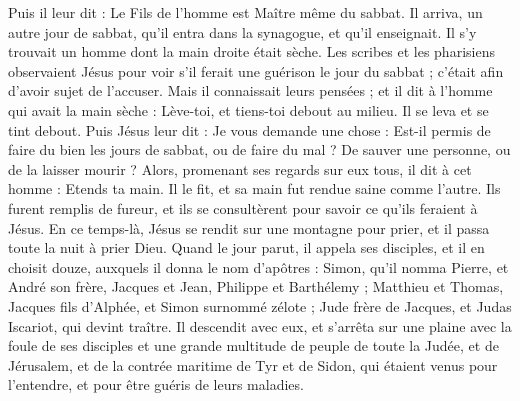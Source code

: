 \begin{multicols}{2}
Puis il leur dit : Le Fils de l'homme est Maître même du sabbat.
Il arriva, un autre jour de sabbat, qu'il entra dans la synagogue, et qu'il enseignait. Il s’y trouvait un homme dont la main droite était sèche.
Les scribes et les pharisiens observaient Jésus pour voir s’il ferait une guérison le jour du sabbat ; c’était afin d’avoir sujet de l’accuser.
Mais il connaissait leurs pensées ; et il dit à l'homme qui avait la main sèche : Lève-toi, et tiens-toi debout au milieu. Il se leva et se tint debout.
Puis Jésus leur dit : Je vous demande une chose : Est-il permis de faire du bien les jours de sabbat, ou de faire du mal ? De sauver une personne, ou de la laisser mourir ?
Alors, promenant ses regards sur eux tous, il dit à cet homme : Etends ta main. Il le fit, et sa main fut rendue saine comme l'autre.
Ils furent remplis de fureur, et ils se consultèrent pour savoir ce qu’ils feraient à Jésus.
En ce temps-là, Jésus se rendit sur une montagne pour prier, et il passa toute la nuit à prier Dieu.
Quand le jour parut, il appela ses disciples, et il en choisit douze, auxquels il donna le nom d’apôtres :
Simon, qu'il nomma Pierre, et André son frère, Jacques et Jean, Philippe et Barthélemy ;
Matthieu et Thomas, Jacques fils d'Alphée, et Simon surnommé zélote ;
Jude frère de Jacques, et Judas Iscariot, qui devint traître.
Il descendit avec eux, et s'arrêta sur une plaine avec la foule de ses disciples et une grande multitude de peuple de toute la Judée, et de Jérusalem, et de la contrée maritime de Tyr et de Sidon, qui étaient venus pour l'entendre, et pour être guéris de leurs maladies.

\end{multicols}
